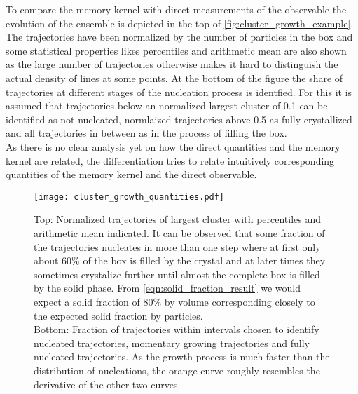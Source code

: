 To compare the memory kernel with direct measurements of the observable the evolution of the ensemble is depicted in the top of \autoref{fig:cluster_growth_example}. The trajectories have been normalized by the number of particles in the box and some statistical properties likes percentiles and arithmetic mean are also shown as the large number of trajectories otherwise makes it hard to distinguish the actual density of lines at some points. At the bottom of the figure the share of trajectories at different stages of the nucleation process is identfied. For this it is assumed that trajectories below an normalized largest cluster of 0.1 can be identified as not nucleated, normlaized trajectories above 0.5 as fully crystallized and all trajectories in between as in the process of filling the box.\\
As there is no clear analysis yet on how the direct quantities and the memory kernel are related, the differentiation tries to relate intuitively corresponding quantities of the memory kernel and the direct observable.\\

\begin{figure}[ht]
\centering
\texttt{[image: cluster\_growth\_quantities.pdf]}
\caption[Largest cluster trajectories of small system with percentiles and average]{Top: Normalized trajectories of largest cluster with percentiles and arithmetic mean indicated. It can be observed that some fraction of the trajectories nucleates in more than one step where at first only about 60\% of the box is filled by the crystal and at later times they sometimes crystalize further until almost the complete box is filled by the solid phase. From \autoref{eqn:solid_fraction_result} we would expect a solid fraction of 80\% by volume corresponding closely to the expected solid fraction by particles.\\
Bottom: Fraction of trajectories within intervals chosen to identify nucleated trajectories, momentary growing trajectories and fully nucleated trajectories. As the growth process is much faster than the distribution of nucleations, the orange curve roughly resembles the derivative of the other two curves.}
\label{fig:cluster_growth_example}
\end{figure}




